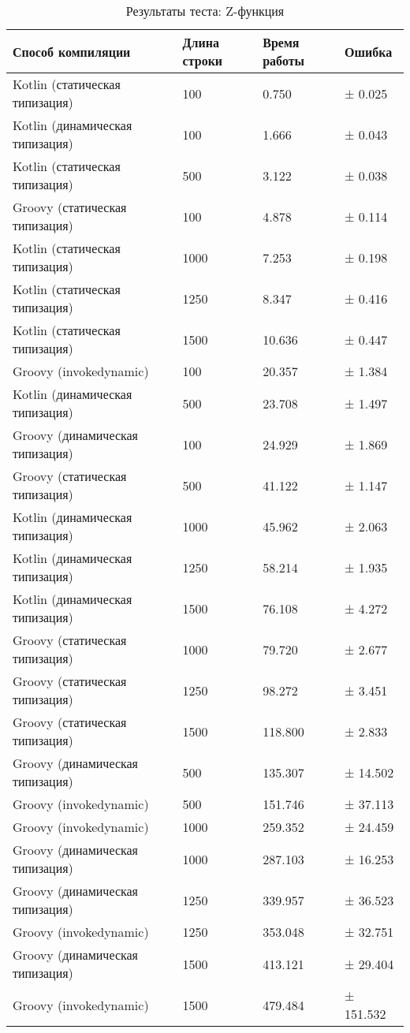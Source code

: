 \begin{table}[h]
\caption{\label{tab:zFunctionBenchResults}Результаты теста: Z-функция}
\begin{center}
\begin{tabular}{|l|l|l|l|}
\hline
Способ компиляции & Длина строки	& Время работы & Ошибка \\
\hline
Kotlin (статическая типизация)  &  100 &   0.750 & ±   0.025 \\
Kotlin (динамическая типизация) &  100 &   1.666 & ±   0.043 \\
Kotlin (статическая типизация)  &  500 &   3.122 & ±   0.038 \\
Groovy (статическая типизация)  &  100 &   4.878 & ±   0.114 \\
Kotlin (статическая типизация)  & 1000 &   7.253 & ±   0.198 \\
Kotlin (статическая типизация)  & 1250 &   8.347 & ±   0.416 \\
Kotlin (статическая типизация)  & 1500 &  10.636 & ±   0.447 \\
Groovy (invokedynamic)          &  100 &  20.357 & ±   1.384 \\
Kotlin (динамическая типизация) &  500 &  23.708 & ±   1.497 \\
Groovy (динамическая типизация) &  100 &  24.929 & ±   1.869 \\
Groovy (статическая типизация)  &  500 &  41.122 & ±   1.147 \\
Kotlin (динамическая типизация) & 1000 &  45.962 & ±   2.063 \\
Kotlin (динамическая типизация) & 1250 &  58.214 & ±   1.935 \\
Kotlin (динамическая типизация) & 1500 &  76.108 & ±   4.272 \\
Groovy (статическая типизация)  & 1000 &  79.720 & ±   2.677 \\
Groovy (статическая типизация)  & 1250 &  98.272 & ±   3.451 \\
Groovy (статическая типизация)  & 1500 & 118.800 & ±   2.833 \\
Groovy (динамическая типизация) &  500 & 135.307 & ±  14.502 \\
Groovy (invokedynamic)          &  500 & 151.746 & ±  37.113 \\
Groovy (invokedynamic)          & 1000 & 259.352 & ±  24.459 \\
Groovy (динамическая типизация) & 1000 & 287.103 & ±  16.253 \\
Groovy (динамическая типизация) & 1250 & 339.957 & ±  36.523 \\
Groovy (invokedynamic)          & 1250 & 353.048 & ±  32.751 \\
Groovy (динамическая типизация) & 1500 & 413.121 & ±  29.404 \\
Groovy (invokedynamic)          & 1500 & 479.484 & ± 151.532 \\
\hline
\end{tabular}
\end{center}
\end{table} 



